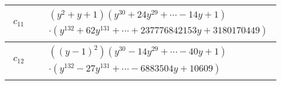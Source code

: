 \documentclass[1p]{elsarticle_modified}
\theoremstyle{definition}
\begin{document}
\begin{tabular}{m{50pt}|m{274pt}}
\hline $$\begin{aligned}c_{11}\end{aligned}$$&$\begin{aligned}
&(y^2+y+1)(y^{30}+24 y^{29}+\cdots-14 y+1)\\
&\cdot(y^{132}+62 y^{131}+\cdots+237776842153 y+3180170449)
\end{aligned}$\\
\hline $$\begin{aligned}c_{12}\end{aligned}$$&$\begin{aligned}
&((y-1)^2)(y^{30}-14 y^{29}+\cdots-40 y+1)\\
&\cdot(y^{132}-27 y^{131}+\cdots-6883504 y+10609)
\end{aligned}$\\
\hline
\end{tabular}
\vskip 2pc
\end{document}
